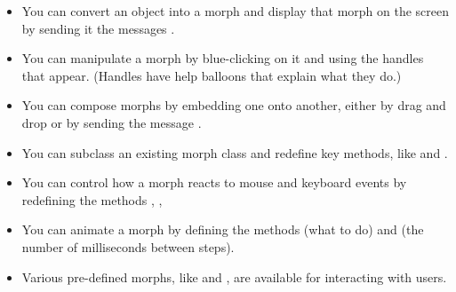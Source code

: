 \documentclass[a4paper,10pt,twoside]{book}
\begin{document}
\begin{itemize}
  \item You can convert an object into a morph and display that morph on the screen by sending it the messages .
  \item You can manipulate a morph by blue-clicking on it and using the handles that appear. (Handles have help balloons that explain what they do.)
  \item You can compose morphs by embedding one onto another, either by drag and drop or by sending the message .
  \item You can subclass an existing morph class and redefine key methods, like  and .
  \item You can control how a morph reacts to mouse and keyboard events by redefining the methods , , \etc
  \item You can animate a morph by defining the methods  (what to do) and  (the number of milliseconds between steps).
  \item Various pre-defined morphs, like  and , are available for interacting with users.
\end{itemize}

\ifx\wholebook\relax\else
\end{document}
